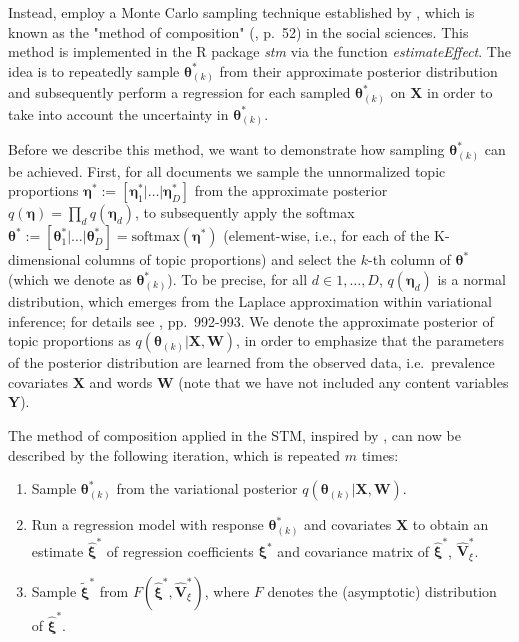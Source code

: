 Instead, \cite{roberts2016model} employ a Monte Carlo sampling technique established by \cite{treier2008democracy}, which is known as the "method of composition" (\citealp{tanner2012tools}, p.\ 52) in the social sciences. This method is implemented in the R package \textit{stm} via the function \textit{estimateEffect}. The idea is to repeatedly sample $\boldsymbol{\theta}_{(k)}^*$ from their approximate posterior distribution and subsequently perform a regression for each sampled $\boldsymbol{\theta}_{(k)}^*$ on $\boldsymbol{X}$ in order to take into account the uncertainty in $\boldsymbol{\theta}_{(k)}^*$.

Before we describe this method, we want to demonstrate how sampling $\boldsymbol{\theta}_{(k)}^*$ can be achieved. First, for all documents we sample the unnormalized topic proportions $\boldsymbol{\eta}^* := [\boldsymbol{\eta}^*_1 | \dots | \boldsymbol{\eta}_D^*]$ from the approximate posterior $q(\boldsymbol{\eta}) = \prod_d q(\boldsymbol{\eta}_d)$, to subsequently apply the softmax $\boldsymbol{\theta}^* := [\boldsymbol{\theta}^*_1 | \dots | \boldsymbol{\theta}^*_D] = \text{softmax}(\boldsymbol{\eta}^*)$ (element-wise, i.e., for each of the K-dimensional columns of topic proportions) and select the $k$-th column of $\boldsymbol{\theta}^*$ (which we denote as $\boldsymbol{\theta}_{(k)}^*$). To be precise, for all $d \in {1, \dots, D}$, $q(\boldsymbol{\eta}_d)$ is a normal distribution, which emerges from the Laplace approximation within variational inference; for details see \cite{roberts2016model}, pp.\ 992-993. We denote the approximate posterior of topic proportions as $q(\boldsymbol{\theta}_{(k)} | \boldsymbol{X}, \boldsymbol{W})$, in order to emphasize that the parameters of the posterior distribution are learned from the observed data, i.e.\ prevalence covariates $\boldsymbol{X}$ and words $\boldsymbol{W}$ (note that we have not included any content variables $\boldsymbol{Y}$).

The method of composition applied in the STM, inspired by \cite{treier2008democracy}, can now be described by the following iteration, which is repeated $m$ times:
\begin{enumerate}
\item Sample $\boldsymbol{\theta}^*_{(k)}$ from the variational posterior $q(\boldsymbol{\theta}_{(k)} | \boldsymbol{X}, \boldsymbol{W})$.
\item Run a regression model with response $\boldsymbol{\theta}^*_{(k)}$ and covariates $\boldsymbol{X}$ to obtain an estimate $\hat{\boldsymbol{\xi}}^*$ of regression coefficients $\boldsymbol{\xi}^*$ and covariance matrix of $\hat{\boldsymbol{\xi}}^*$, $\hat{\boldsymbol{V}}^*_{\xi}$.
\item Sample $\tilde{\boldsymbol{\xi}}^*$ from $F(\hat{\boldsymbol{\xi}}^*, \hat{\boldsymbol{V}}^*_{\xi})$, where $F$ denotes the (asymptotic) distribution of $\hat{\boldsymbol{\xi}}^*$.
\end{enumerate}

